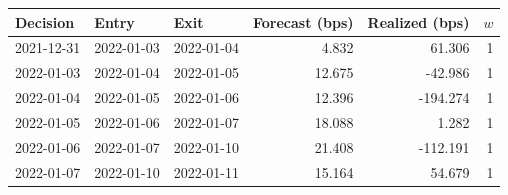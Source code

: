 \begin{tabular}{lllrrr}
\toprule
Decision & Entry & Exit & Forecast (bps) & Realized (bps) & $w$ \\
\midrule
2021-12-31 & 2022-01-03 & 2022-01-04 & 4.832 & 61.306 & 1 \\
2022-01-03 & 2022-01-04 & 2022-01-05 & 12.675 & -42.986 & 1 \\
2022-01-04 & 2022-01-05 & 2022-01-06 & 12.396 & -194.274 & 1 \\
2022-01-05 & 2022-01-06 & 2022-01-07 & 18.088 & 1.282 & 1 \\
2022-01-06 & 2022-01-07 & 2022-01-10 & 21.408 & -112.191 & 1 \\
2022-01-07 & 2022-01-10 & 2022-01-11 & 15.164 & 54.679 & 1 \\
\bottomrule
\end{tabular}
